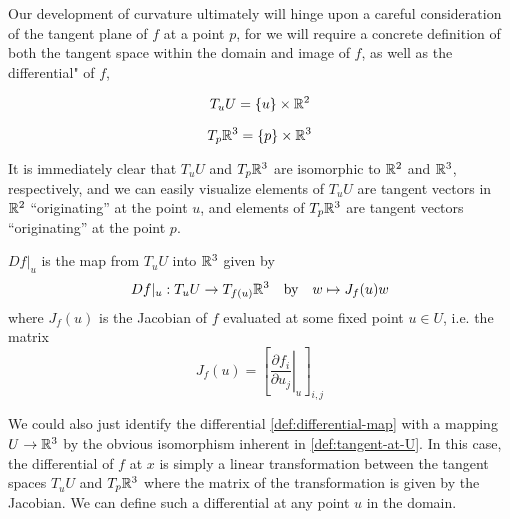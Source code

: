    Our development of curvature ultimately will hinge upon a careful consideration of the tangent plane of $f$ at a point $p$, for we will require a concrete definition of both the tangent space within the domain and image of $f$,
    as well as the differential" of $f$,
    
    
    \begin{defn} \label{def:tangent-at-U}
    	\[ T_{u} U = \left\{u\right\} \times \mathbb{R}^2
    	\]
    	\end{defn}
    \begin{defn} \label{def:tangent-of-R3}
    	\[ T_{p} \mathbb{R}^3 = \{p\} \times \mathbb{R}^3
    	\]
    \end{defn}
    It is immediately clear that $T_uU$ and $T_p\mathbb{R}^3$ are isomorphic to
    $\mathbb{R}^2$ and $\mathbb{R}^3$, respectively, and we can easily visualize elements of $T_uU$ are tangent vectors in $\mathbb{R}^2$ ``originating'' at the point $u$, and elements of $T_p\mathbb{R}^3$ are tangent vectors ``originating'' at the point $p$.
\begin{defn} \label{def:differential-map}
       	$Df\vert_u$ is the map from $T_uU$ into $\mathbb{R}^3$ given by
    \[
     Df|_u : T_uU \to T_{f(u)}\mathbb{R}^3
     \quad \textrm{by}
     \quad w \mapsto J_f (u) w
    \]
where $J_f(u)$ is the Jacobian of $f$ evaluated at some fixed point $u \in U$, i.e. the matrix
\[
J_f (u) = \left[ \left.\frac{\partial f_i}{\partial u_j}\right\vert_u \right]_{i,j}
\]
\end{defn} %
We could also just identify the differential \cref{def:differential-map}  with a mapping $U \to \mathbb{R}^3$ by the obvious isomorphism inherent in \cref{def:tangent-at-U}. In this case, the differential of $f$ at $x$ is simply a linear transformation between the tangent spaces $T_uU$ and $T_p\mathbb{R}^3$ where the matrix of the transformation is given by the Jacobian. We can define such a differential at any point $u$ in the domain.

